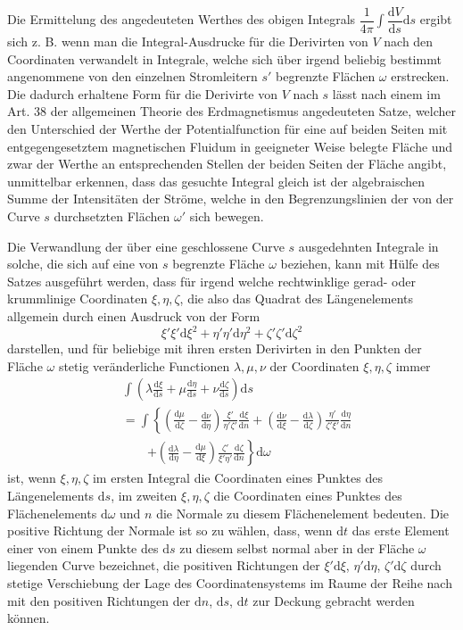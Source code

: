 Die Ermittelung des angedeuteten Werthes des obigen Integrals $\dfrac1{4\pi}\allowbreak\int\dfrac{\mathrm dV}{\mathrm ds}\mathrm ds$ ergibt sich z. B. wenn man die Integral-Ausdrucke für die Derivirten von $V$ nach den Coordinaten verwandelt in Integrale, welche sich über irgend beliebig bestimmt angenommene von den einzelnen Stromleitern $s'$ begrenzte Flächen $\omega$ erstrecken. Die dadurch erhaltene Form für die Derivirte von $V$ nach $s$ lässt nach einem im Art. 38 der allgemeinen Theorie des Erdmagnetismus angedeuteten Satze, welcher den Unterschied der Werthe der Potentialfunction für eine auf beiden Seiten mit entgegengesetztem magnetischen Fluidum in geeigneter Weise belegte Fläche und zwar der Werthe an entsprechenden Stellen der beiden Seiten der Fläche angibt, unmittelbar erkennen, dass das gesuchte Integral gleich ist der algebraischen Summe der Intensitäten der Ströme, welche in den Begrenzungslinien der von der Curve $s$ durchsetzten Flächen $\omega'$ sich bewegen.

Die Verwandlung der über eine geschlossene Curve $s$ ausgedehnten Integrale in solche, die sich auf eine von $s$ begrenzte Fläche $\omega$ beziehen, kann mit Hülfe des Satzes ausgeführt werden, dass für irgend welche rechtwinklige gerad- oder krummlinige Coordinaten $\xi,\eta,\zeta$, die also das Quadrat des Längenelements allgemein durch einen Ausdruck von der Form
\[
\xi'\xi'\mathrm d\xi^2+\eta'\eta'\mathrm d\eta^2+\zeta'\zeta'\mathrm d\zeta^2
\]
darstellen, und für beliebige mit ihren ersten Derivirten in den Punkten der Fläche $\omega$ stetig veränderliche Functionen $\lambda,\mu,\nu$ der Coordinaten $\xi,\eta,\zeta$ immer
\[
\begin{aligned}
&\int\left(\lambda\frac{\mathrm d\xi}{\mathrm ds}+\mu\frac{\mathrm d\eta}{\mathrm ds}+\nu\frac{\mathrm d\zeta}{\mathrm ds}\right)\mathrm ds\\
&=\int\left\{\left(\frac{\mathrm d\mu}{\mathrm d\zeta}-\frac{\mathrm d\nu}{\mathrm d\eta}\right)\frac{\xi'}{\eta'\zeta'}\frac{\mathrm d\xi}{\mathrm dn}+\left(\frac{\mathrm d\nu}{\mathrm d\xi}-\frac{\mathrm d\lambda}{\mathrm d\zeta}\right)\frac{\eta'}{\zeta'\xi'}\frac{\mathrm d\eta}{\mathrm dn}\right.\\
&\qquad\left.+\left(\frac{\mathrm d\lambda}{\mathrm d\eta}-\frac{\mathrm d\mu}{\mathrm d\xi}\right)\frac{\zeta'}{\xi'\eta'}\frac{\mathrm d\zeta}{\mathrm dn}\right\}\mathrm d\omega
\end{aligned}
\]
ist, wenn $\xi,\eta,\zeta$ im ersten Integral die Coordinaten eines Punktes des Längenelements $\mathrm ds$, im zweiten $\xi,\eta,\zeta$ die Coordinaten eines Punktes des Flächenelements $\mathrm d\omega$ und $n$ die Normale zu diesem Flächenelement bedeuten. Die positive Richtung der Normale ist so zu wählen, dass, wenn $\mathrm dt$ das erste Element einer von einem Punkte des $\mathrm ds$ zu diesem selbst normal aber in der Fläche $\omega$ liegenden Curve bezeichnet, die positiven Richtungen der $\xi'\mathrm d\xi$, $\eta'\mathrm d\eta$, $\zeta'\mathrm d\zeta$ durch stetige Verschiebung der Lage des Coordinatensystems im Raume der Reihe nach mit den positiven Richtungen der $\mathrm dn$, $\mathrm ds$, $\mathrm dt$ zur Deckung gebracht werden können.

